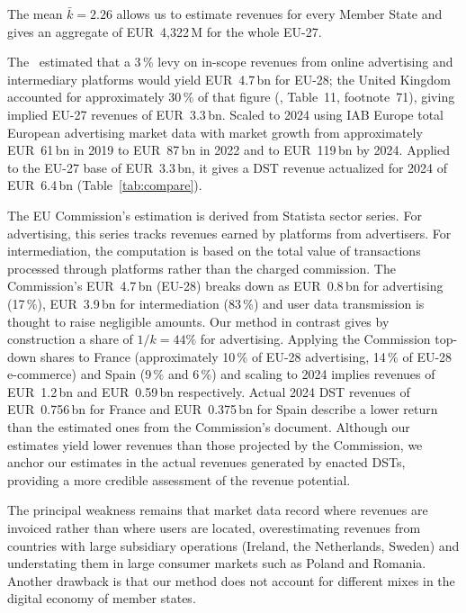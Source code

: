 \documentclass[../../main]{subfiles}
\begin{document}
The mean $\bar{k} = 2.26$ allows us to estimate revenues for every Member State and gives an aggregate of EUR~4{,}322\,M for the whole EU-27.


The~\cite{swd_2018_81} estimated that a 3\,\% levy on in-scope revenues from online advertising and intermediary platforms would yield EUR~4.7\,bn for EU-28; the United Kingdom accounted for approximately 30\,\% of that figure (\citealp{swd_2018_81}, Table~11, footnote~71), giving implied EU-27 revenues of EUR~3.3\,bn.
Scaled to 2024 using IAB Europe total European advertising market data with market growth from approximately EUR~61\,bn in 2019 to EUR~87\,bn in 2022 and to EUR~119\,bn by 2024.
Applied to the EU-27 %
base of EUR~3.3\,bn, it gives a DST revenue actualized for 2024 of EUR~6.4\,bn (Table~\ref{tab:compare}).

The EU Commission's estimation is derived from Statista sector series.
For advertising, this series tracks revenues earned by platforms from advertisers.
For intermediation, the computation is based on the total value of transactions processed through platforms rather than the charged commission.
The Commission's EUR~4.7\,bn (EU-28) breaks down as EUR~0.8\,bn for advertising (17\,\%), EUR~3.9\,bn for intermediation (83\,\%) and user data transmission is thought to raise negligible amounts.
Our method in contrast gives by construction a share of $1/k = 44\%$ for advertising.
Applying the Commission top-down shares to France (approximately 10\,\% of EU-28 advertising, 14\,\% of EU-28 e-commerce) and Spain (9\,\% and 6\,\%) and scaling to 2024 implies revenues of EUR~1.2\,bn and EUR~0.59\,bn respectively.
Actual 2024 DST revenues of EUR~0.756\,bn for France and EUR~0.375\,bn for Spain describe a lower return than the estimated ones from the Commission's document.
Although our estimates yield lower revenues than those projected by the Commission, we anchor our estimates in the actual revenues generated by enacted DSTs, providing a more credible assessment of the revenue potential.




The principal weakness remains that market data record where revenues are invoiced rather than where users are located, overestimating %
revenues from %
countries with large subsidiary operations (Ireland, the Netherlands, Sweden) and understating them in large consumer markets such as Poland and Romania.
Another drawback is that our method does not account for different mixes in the digital economy of member states.
\end{document}

